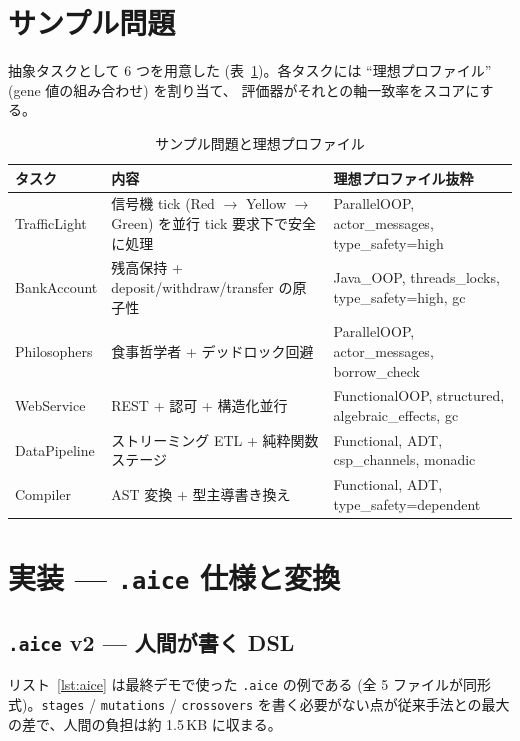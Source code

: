 \documentclass[a4paper,11pt]{article}
\begin{document}
\section{サンプル問題}

抽象タスクとして 6 つを用意した (表~\ref{tab:tasks})。各タスクには
``理想プロファイル'' (gene 値の組み合わせ) を割り当て、
評価器がそれとの軸一致率をスコアにする。

\begin{table}[h]
\centering
\caption{サンプル問題と理想プロファイル}
\label{tab:tasks}
\footnotesize
\begin{tabularx}{\linewidth}{lXl}
\toprule
タスク & 内容 & 理想プロファイル抜粋 \\
\midrule
TrafficLight  & 信号機 tick (Red \(\to\) Yellow \(\to\) Green) を並行 tick 要求下で安全に処理 & ParallelOOP, actor\_messages, type\_safety=high \\
BankAccount   & 残高保持 + deposit/withdraw/transfer の原子性 & Java\_OOP, threads\_locks, type\_safety=high, gc \\
Philosophers  & 食事哲学者 + デッドロック回避 & ParallelOOP, actor\_messages, borrow\_check \\
WebService    & REST + 認可 + 構造化並行 & FunctionalOOP, structured, algebraic\_effects, gc \\
DataPipeline  & ストリーミング ETL + 純粋関数ステージ & Functional, ADT, csp\_channels, monadic \\
Compiler      & AST 変換 + 型主導書き換え & Functional, ADT, type\_safety=dependent \\
\bottomrule
\end{tabularx}
\end{table}

\section{実装 — \texttt{.aice} 仕様と変換}

\subsection{\texttt{.aice} v2 — 人間が書く DSL}

リスト~\ref{lst:aice} は最終デモで使った \texttt{.aice} の例である
(全 5 ファイルが同形式)。\texttt{stages} / \texttt{mutations} / \texttt{crossovers}
を書く必要がない点が従来手法との最大の差で、人間の負担は約
1.5\,KB に収まる。
\end{document}
